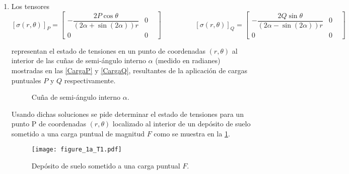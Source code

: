 \documentclass[../notas medios.tex]{subfiles}
\begin{document}
\begin{enumerate}
\item \label{punto23}  Los tensores
\[[\sigma(r,{\theta})]_P
 	= 
 	\begin{bmatrix}
     	-\dfrac{2P\cos\theta}{(2\alpha + \sin(2\alpha)) r} & 0 \;\;\;\\
     	0 & 0 \;\;\;
 	\end{bmatrix}
 	\hspace{2cm}
	[\sigma(r,{\theta})]_Q
 	= 
  	\begin{bmatrix}
     	-\dfrac{2Q\sin\theta}{(2\alpha - \sin(2\alpha)) r} & 0 \;\;\; \\
     	0 & 0 \;\;\;
 	\end{bmatrix}\]
 	
representan el estado de tensiones en un punto de coordenadas $(r, \theta)$ al interior de las cuñas de semi-ángulo interno $\alpha$ (medido en radianes) mostradas en las \cref{CargaP} y \cref{CargaQ}, resultantes de la aplicación de cargas puntuales $P$ y $Q$ respectivamente. 


\begin{figure}[H]
	\centering	
	\hspace{1.5cm}
	\caption{Cuña de semi-ángulo interno $\alpha$. }
\end{figure}

Usando dichas soluciones se pide determinar el estado de tensiones para un punto P de coordenadas $(r, \theta)$ localizado al interior de un depósito de suelo sometido a una carga puntual de magnitud $F$ como se muestra en la \cref{figure1}. 
%
\begin{figure}[h]
	\centering
		\texttt{[image: figure\_1a\_T1.pdf]} 		
	\caption{Depósito de suelo sometido a una carga puntual $F$.}
	\label{figure1}
\end{figure}
\end{enumerate}
\end{document}
